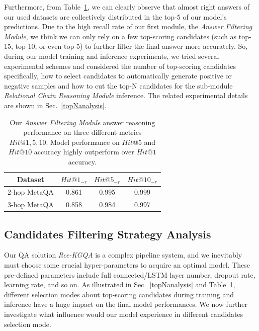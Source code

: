 \documentclass[pdflatex,sn-mathphys]{sn-jnl}%
\theoremstyle{thmstyleone}%
\theoremstyle{thmstyletwo}%
\theoremstyle{thmstylethree}%
\begin{document}
Furthermore, from Table~\ref{comparison_hit1}, we can clearly observe that almost right answers of our used datasets are collectively distributed in the top-5 of our model's predictions. Due to the high recall rate of our first module, the \textit{Answer Filtering Module}, we think we can only rely on a few top-scoring candidates (such as top-15, top-10, or even top-5) to further filter the final answer more accurately. So, during our model training and inference experiments, we tried several experimental schemes and considered the number of top-scoring candidates specifically, how to select candidates to automatically generate positive or negative samples and how to cut the top-N candidates for the sub-module \textit{Relational Chain Reasoning Module} inference. The related experimental details are shown in Sec.~\ref{topNanalysis}.

\label{topNanalysis}

\begin{table}[h]
    \centering
    \begin{tabular}{c|c|c|c} \hline
        Dataset & $Hit@1_{-r}$ & $Hit@5_{-r}$ & $Hit@10_{-r}$ \\ \hline
        2-hop MetaQA  & 0.861 & 0.995 & 0.999 \\
        3-hop MetaQA  & 0.858 & 0.984 & 0.997 \\ \hline
    \end{tabular}
    \caption{Our \textit{Answer Filtering Module} answer reasoning performance on three different metrics $Hit@1, 5, 10$. Model performance on $Hit@5$ and $Hit@10$ accuracy highly outperform over $Hit@1$ accuracy.}
    \label{comparison_hit1}
\end{table}


\subsection{Candidates Filtering Strategy Analysis}
Our QA solution \textit{Rce-KGQA} is a complex pipeline system, and we inevitably must choose some crucial hyper-parameters to acquire an optimal model. These pre-defined parameters include full connected/LSTM layer number, dropout rate, learning rate, and so on. As illustrated in Sec.~\ref{topNanalysis} and Table~\ref{comparison_hit1}, different selection modes about top-scoring candidates during training and inference have a huge impact on the final model performances. We now further investigate what influence would our model experience in different candidates selection mode.
\end{document}
